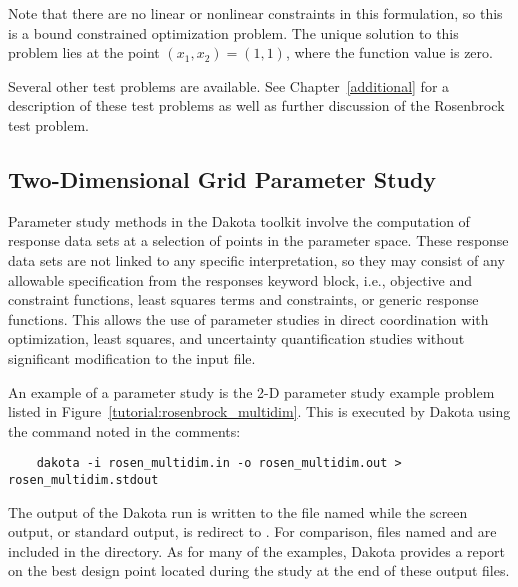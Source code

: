 Note that there are no linear or nonlinear constraints in this
formulation, so this is a bound constrained optimization problem. The
unique solution to this problem lies at the point
$(x_1,x_2) = (1,1)$, where the function value is zero.

Several other test problems are available. See
Chapter~\ref{additional} for a description of these test problems
as well as further discussion of the Rosenbrock test problem.


\subsection{Two-Dimensional Grid Parameter Study}\label{tutorial:examples:param_study}

Parameter study methods in the Dakota toolkit involve the computation 
of response data sets at a selection of points in the parameter space. 
These response data sets are not linked to any specific interpretation,
so they may consist of any allowable specification from the responses 
keyword block, i.e., objective and constraint functions, least squares 
terms and constraints, or generic response functions. This allows the 
use of parameter studies in direct coordination with optimization, least 
squares, and uncertainty quantification studies without significant
modification to the input file. 

An example of a parameter study is the 2-D parameter study example problem 
listed in Figure~\ref{tutorial:rosenbrock_multidim}. This is 
executed by Dakota using the command noted in the comments:
\begin{small}
\begin{verbatim}
    dakota -i rosen_multidim.in -o rosen_multidim.out > rosen_multidim.stdout
\end{verbatim}
\end{small}

The output of the Dakota run is written to the file named
 while the screen output, or
standard output, is redirect to .
For comparison, files named 
and  are included in the
 directory. As for many of the examples,
Dakota provides a report on the best design point located during the
study at the end of these output files.

